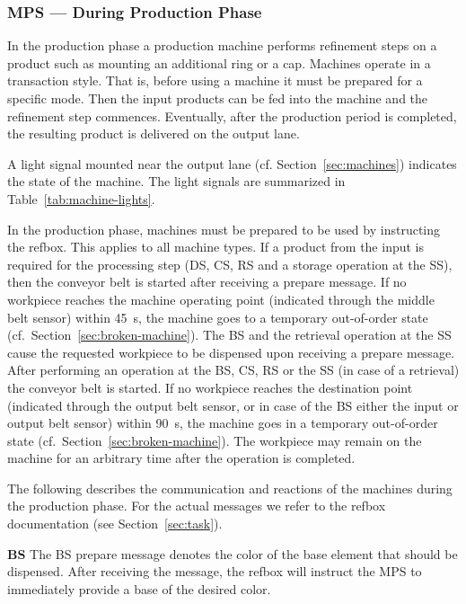 \documentclass[12pt,twoside]{article}
\newcommand{\refsec}[1]{Section~\ref{#1}}
\newcommand{\reftab}[1]{Table~\ref{#1}}
\begin{document}
\subsubsection{MPS --- During Production Phase}
\label{sec:production-machines-production}
In the production phase a production machine performs refinement steps on
a product such as mounting an additional ring or a cap. Machines
operate in a transaction style. That is, before using a machine it
must be prepared for a specific mode. Then the input products can be fed
into the machine and the refinement step commences. Eventually, after
the production period is completed, the resulting product is delivered
on the output lane.

A light signal mounted near the output lane
(cf. \refsec{sec:machines}) indicates the state of the machine.
The light signals are summarized in
\reftab{tab:machine-lights}.

In the production phase, machines must be prepared to be used by instructing
the refbox. This applies to all machine types.
If a product from the input is required for the processing step
(\ac{DS}, \ac{CS}, \ac{RS} and a storage operation at the \ac{SS}),
then the conveyor belt is started
after receiving a prepare message. If no workpiece reaches the
machine operating point (indicated through the middle belt sensor)
within \SI{45}{\second}, the machine goes to a temporary out-of-order
state (cf.~\refsec{sec:broken-machine}).
The \ac{BS} and the retrieval operation at the \ac{SS} cause
the requested workpiece to be dispensed upon receiving a prepare message.
After performing an operation at the \ac{BS}, \ac{CS}, \ac{RS} or the \ac{SS}
(in case of a retrieval) the conveyor belt is started.
If no workpiece reaches the destination
point (indicated through the output belt sensor, or in case of the \ac{BS}
either the input or output belt sensor) within \SI{90}{\second},
the machine goes in a temporary out-of-order state
(cf.~\refsec{sec:broken-machine}).
The workpiece may remain on the machine for an arbitrary time after the
operation is completed.

The following describes the communication and reactions of the
machines during the production phase. For the actual messages we refer
to the \ac{refbox} documentation (see \refsec{sec:task}).

\smallskip

\noindent\textbf{\acl{BS}}
The \ac{BS} prepare message denotes the color of the base element that should
be dispensed. After receiving the message, the \ac{refbox} will instruct
the \ac{MPS} to immediately provide a base of the desired color.
\end{document}
